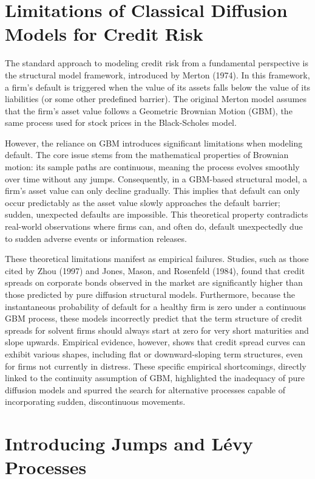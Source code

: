 \documentclass[11pt,twoside,openright]{report}
\begin{document}
\section{Limitations of Classical Diffusion Models for Credit Risk}
\label{sec:limitations_diffusion}

The standard approach to modeling credit risk from a fundamental perspective is the structural model framework, introduced by Merton (1974). In this framework, a firm's default is triggered when the value of its assets falls below the value of its liabilities (or some other predefined barrier). The original Merton model assumes that the firm's asset value follows a Geometric Brownian Motion (GBM), the same process used for stock prices in the Black-Scholes model.

However, the reliance on GBM introduces significant limitations when modeling default. The core issue stems from the mathematical properties of Brownian motion: its sample paths are continuous, meaning the process evolves smoothly over time without any jumps. Consequently, in a GBM-based structural model, a firm's asset value can only decline gradually. This implies that default can only occur predictably as the asset value slowly approaches the default barrier; sudden, unexpected defaults are impossible. This theoretical property contradicts real-world observations where firms can, and often do, default unexpectedly due to sudden adverse events or information releases.

These theoretical limitations manifest as empirical failures. Studies, such as those cited by Zhou (1997) and Jones, Mason, and Rosenfeld (1984), found that credit spreads on corporate bonds observed in the market are significantly higher than those predicted by pure diffusion structural models. Furthermore, because the instantaneous probability of default for a healthy firm is zero under a continuous GBM process, these models incorrectly predict that the term structure of credit spreads for solvent firms should always start at zero for very short maturities and slope upwards. Empirical evidence, however, shows that credit spread curves can exhibit various shapes, including flat or downward-sloping term structures, even for firms not currently in distress. These specific empirical shortcomings, directly linked to the continuity assumption of GBM, highlighted the inadequacy of pure diffusion models and spurred the search for alternative processes capable of incorporating sudden, discontinuous movements.

\section{Introducing Jumps and Lévy Processes}
\label{sec:intro_jumps_levy}
\end{document}
